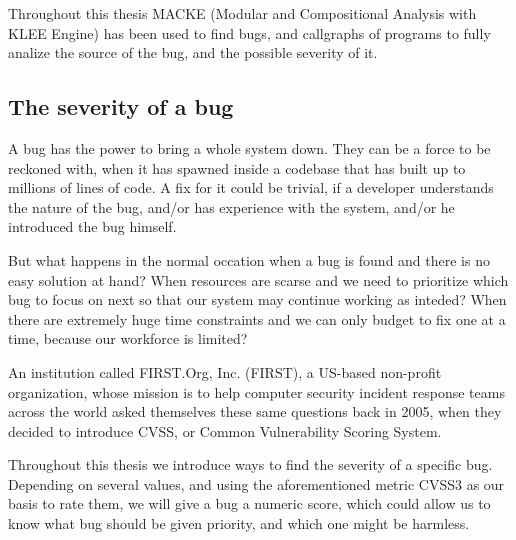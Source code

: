 Throughout this thesis MACKE (Modular and Compositional Analysis with KLEE Engine)\parencite{ognawala} has been used to find bugs, and callgraphs of programs to fully analize the source of the bug, and the possible severity of it.


\subsection{The severity of a bug}

A bug has the power to bring a whole system down. They can be a force to be reckoned with, when it has spawned inside a codebase that has built up to millions of lines of code. A fix for it could be trivial, if a developer understands the nature of the bug, and/or has experience with the system, and/or he introduced the bug himself. 

But what happens in the normal occation when a bug is found and there is no easy solution at hand? When resources are scarse and we need to prioritize which bug to focus on next so that our system may continue working as inteded?
When there are extremely huge time constraints and we can only budget to fix one at a time, because our workforce is limited?

An institution called FIRST.Org, Inc. (FIRST), a US-based non-profit organization, whose mission is to
help computer security incident response teams across the world\parencite{cvss3} asked themselves these same questions back in 2005, when they decided to introduce CVSS, or Common Vulnerability Scoring System\parencite{cvss3}.

Throughout this thesis we introduce ways to find the severity of a specific bug. Depending on several values, and using the aforementioned metric CVSS3 as our basis to rate them, we will give a bug a numeric score, which could allow us to know what bug should be given priority, and which one might be harmless.